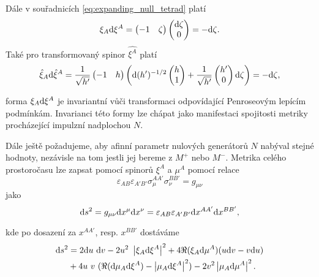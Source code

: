 Dále v souřadnicích \eqref{eq:expanding_null_tetrad} platí
\begin{equation}
    \xi_A \mathrm{d} \xi^A = \begin{pmatrix}
        -1 & \zeta
    \end{pmatrix}
    \begin{pmatrix}
        \mathrm{d}\zeta \\ 0
    \end{pmatrix} = -\mathrm{d}\zeta.
\end{equation}
Také pro transformovaný spinor $\hat{\xi^A}$ platí
\begin{equation}
    \hat{\xi}_A \mathrm{d} \hat{\xi}^A = \frac{1}{\sqrt{h'}} \begin{pmatrix}
        -1 & h
    \end{pmatrix}  \left( \mathrm{d} (h')^{-1/2} \begin{pmatrix}
        h \\ 1
    \end{pmatrix} + \frac{1}{\sqrt{h'}} \begin{pmatrix}
        h' \\ 0
    \end{pmatrix} \mathrm{d} \zeta \right) = -\mathrm{d} \zeta,
\end{equation}

forma $\xi_A \mathrm{d} \xi^A$ je invariantní vůči transformaci odpovídající
Penroseovým lepícím podmínkám. Invarianci této formy lze chápat jako
manifestaci spojitosti metriky procházející impulzní nadplochou $N$.

Dále ještě požadujeme, aby afinní parametr nulových generátorů $N$ nabýval stejné
hodnoty, nezávisle na tom jestli jej bereme z $M^+$ nebo $M^-$. Metrika celého
prostoročasu lze zapsat pomocí spinorů $\xi^A$ a $\mu^A$ pomocí relace \cite{doi:10.1142/5222}
\begin{equation}
    \varepsilon_{AB} \varepsilon_{A'B'} \sigma_{\mu}^{AA'} \sigma_{\nu}^{BB'} = g_{\mu \nu}
\end{equation}
jako
\begin{equation}
    \mathrm{d} s^2 = g_{\mu \nu} \mathrm{d} x^\mu \mathrm{d} x^\nu = \varepsilon_{AB} \varepsilon_{A'B'} \mathrm{d} x^{AA'} \mathrm{d} x^{BB'},
\end{equation}

kde po dosazení za $x^{AA'}$, resp. $x^{BB'}$ dostáváme
\begin{equation}
    \begin{split}
        \mathrm{d} s^2 &= 2 \mathrm{d} u ~ \mathrm{d} v - 2 u^2 ~ \left| \xi_A \mathrm{d} \xi^A \right|^2 + 4 \Re(\xi_A \mathrm{d} \mu^A)(u \mathrm{d} v - v \mathrm{d} u) \\
        &+ 4 u ~v ~ (\Re(\mathrm{d} \mu_A \mathrm{d} \xi^A) - \left|\mu_A \mathrm{d} \xi^A \right|^2) - 2 v^2 \left|\mu_A \mathrm{d} \mu^A \right|^2.
    \end{split}
\end{equation}


